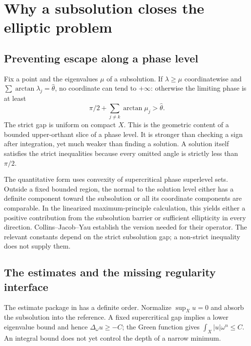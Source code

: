 \documentclass[12pt,reqno]{amsart}
\newcommand{\hth}{\widehat\theta}
\begin{document}
\section{Why a subsolution closes the elliptic problem}\label{sec:analytic}
\subsection{Preventing escape along a phase level}
Fix a point and the eigenvalues $\mu$ of a subsolution. If $\lambda\geq\mu$ coordinatewise and $\sum\arctan\lambda_j=\hth$, no coordinate can tend to $+\infty$: otherwise the limiting phase is at least
\[
 \pi/2+\sum_{j\ne k}\arctan\mu_j>\hth.
\]
The strict gap is uniform on compact $X$. This is the geometric content of a bounded upper-orthant slice of a phase level. It is stronger than checking a sign after integration, yet much weaker than finding a solution. A solution itself satisfies the strict inequalities because every omitted angle is strictly less than $\pi/2$.

The quantitative form uses convexity of supercritical phase superlevel sets. Outside a fixed bounded region, the normal to the solution level either has a definite component toward the subsolution or all its coordinate components are comparable. In the linearized maximum-principle calculation, this yields either a positive contribution from the subsolution barrier or sufficient ellipticity in every direction. Collins--Jacob--Yau \cite[Proposition 3.5]{CJY} establish the version needed for their operator. The relevant constants depend on the strict subsolution gap; a non-strict inequality does not supply them.

\subsection{The estimates and the missing regularity interface}
The estimate package in \cite[Sections 3--6]{CJY} has a definite order. Normalize $\sup_Xu=0$ and absorb the subsolution into the reference. A fixed supercritical gap implies a lower eigenvalue bound and hence $\Delta_\omega u\geq-C$; the Green function gives $\int_X|u|\omega^n\leq C$. An integral bound does not yet control the depth of a narrow minimum.
\end{document}
